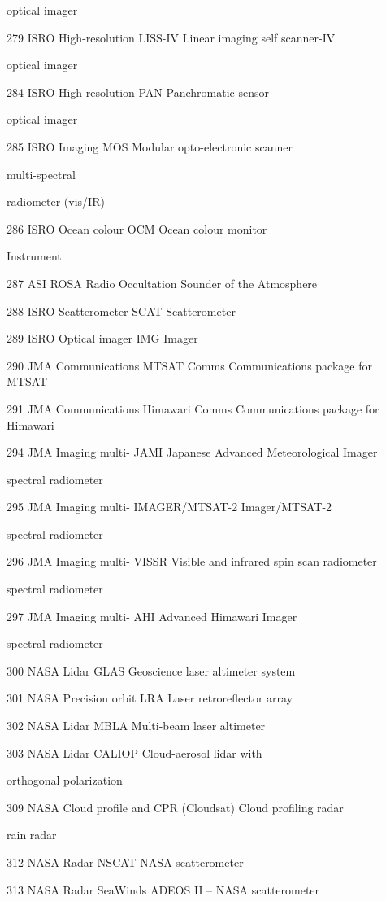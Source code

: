 optical imager

279 ISRO High-resolution LISS-IV Linear imaging self scanner-IV

optical imager

284 ISRO High-resolution PAN Panchromatic sensor

optical imager

285 ISRO Imaging MOS Modular opto-electronic scanner

multi-spectral

radiometer (vis/IR)

286 ISRO Ocean colour OCM Ocean colour monitor

Instrument

287 ASI ROSA Radio Occultation Sounder of the Atmosphere

288 ISRO Scatterometer SCAT Scatterometer

289 ISRO Optical imager IMG Imager

290 JMA Communications MTSAT Comms Communications package for MTSAT

291 JMA Communications Himawari Comms Communications package for Himawari

294 JMA Imaging multi- JAMI Japanese Advanced Meteorological Imager

spectral radiometer

295 JMA Imaging multi- IMAGER/MTSAT-2 Imager/MTSAT-2

spectral radiometer

296 JMA Imaging multi- VISSR Visible and infrared spin scan radiometer

spectral radiometer

297 JMA Imaging multi- AHI Advanced Himawari Imager

spectral radiometer

300 NASA Lidar GLAS Geoscience laser altimeter system

301 NASA Precision orbit LRA Laser retroreflector array

302 NASA Lidar MBLA Multi-beam laser altimeter

303 NASA Lidar CALIOP Cloud-aerosol lidar with

orthogonal polarization

309 NASA Cloud profile and CPR (Cloudsat) Cloud profiling radar

rain radar

312 NASA Radar NSCAT NASA scatterometer

313 NASA Radar SeaWinds ADEOS II -- NASA scatterometer

